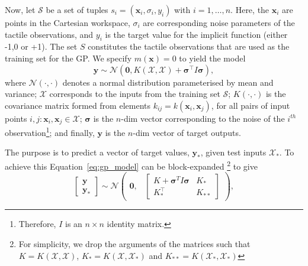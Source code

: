 Now, let $\mathcal{S}$ be a set of tuples $s_i = (\mathbf{x}_i, \sigma_i, y_i)$ with $i=1,\ldots,n$. Here, the $\mathbf{x}_i$ are points in the Cartesian workspace, $\sigma_i$ are corresponding noise parameters of the tactile observations, and $y_i$ is the target value for the implicit function (either -1,0 or +1). The set $S$ constitutes the tactile observations that are used as the training set for the GP. We specify $m(\mathbf{x})=0$ to yield the model
\begin{equation}
\mathbf{y} \sim \mathcal{N}(\mathbf{0}, K(\mathcal{X},\mathcal{X}) + \boldsymbol{\sigma}^\top I \boldsymbol{\sigma}), \label{eq:gp_model}
\end{equation}
where $\mathcal{N}(\cdot, \cdot)$ denotes a normal distribution parameterised by mean and variance; $\mathcal{X}$ corresponds to the inputs from the training set $\mathcal{S}$;  $K(\cdot, \cdot)$ is the covariance matrix formed from  elements $k_{ij} = k(\mathbf{x}_i, \mathbf{x}_j)$, for all pairs of input points $i,j : \mathbf{x}_i, \mathbf{x}_j \in \mathcal{X}$; $\boldsymbol{\sigma}$ is the $n$-dim vector corresponding to the noise of the $i^{th}$ observation\footnote{Therefore, $I$ is an $n \times n$ identity matrix.}; and finally, $\mathbf{y}$ is the $n$-dim vector of target outputs. 

The purpose is to predict a vector of target values, $\mathbf{y}_*$, given test inputs $\mathcal{X}_*$. To achieve this Equation~\ref{eq:gp_model} can be block-expanded \footnote{For simplicity, we drop the arguments of the matrices such that $K = K(\mathcal{X},\mathcal{X})$, $K_* = K(\mathcal{X},\mathcal{X}_*)$ and $K_{**} = K(\mathcal{X}_*,\mathcal{X}_*)$} \cite{Rasmussen2006Gaussian} to give
\begin{equation}
    \begin{bmatrix} \mathbf{y} \\ \mathbf{y}_* \end{bmatrix} \sim
               \mathcal{N}\begin{pmatrix}\mathbf{0}, & \begin{bmatrix} K + \boldsymbol{\sigma}^{T} I \boldsymbol{\sigma} &
                                                 K_* \\
                                                 K_*^\top &
                                                 K_{**} \end{bmatrix}
                           \end{pmatrix},
\end{equation}

